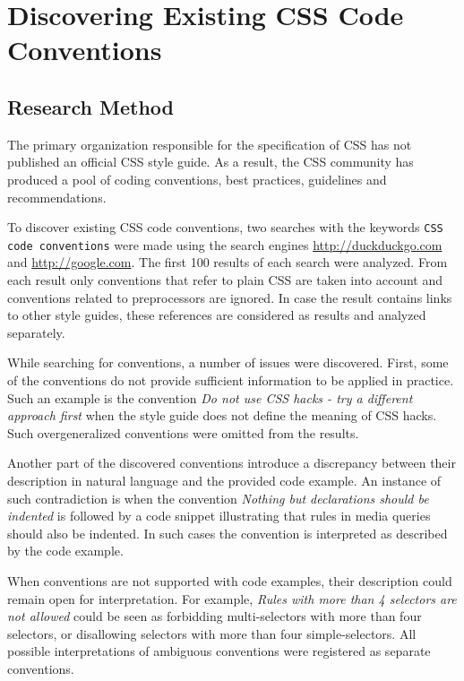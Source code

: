\chapter{Discovering Existing CSS Code Conventions}
\label{sec:discovering}

\section{Research Method}

The primary organization responsible for the specification of CSS has not published an official CSS
style guide. As a result, the CSS community has produced a pool of coding conventions, best
practices, guidelines and recommendations.

To discover existing CSS code conventions, two searches with the keywords \texttt{CSS code
conventions} were made using the search engines \url{http://duckduckgo.com} and
\url{http://google.com}. The first 100 results of each search were analyzed. From each result
only conventions that refer to plain CSS are taken into account and conventions related to
preprocessors are ignored. In case the result contains links to other style guides, these
references are considered as results and analyzed separately.

While searching for conventions, a number of issues were discovered. First, some of the
conventions do not provide sufficient information to be applied in practice. Such an example is the
convention \textit{Do not use CSS hacks - try a different approach first} when the style guide does
not define the meaning of CSS hacks. Such overgeneralized conventions were omitted from the results.

Another part of the discovered conventions introduce a discrepancy between their description in
natural language and the provided code example. An instance of such contradiction is when the
convention \textit{Nothing but declarations should be indented} is followed by a code snippet
illustrating that rules in media queries should also be indented. In such cases the convention is
interpreted as described by the code example.

When conventions are not supported with code examples, their description could remain open for
interpretation. For example, \textit{Rules with more than 4 selectors are not allowed} could be seen
as forbidding multi-selectors with more than four selectors, or disallowing selectors with more than
four simple-selectors. All possible interpretations of ambiguous conventions were registered as
separate conventions.

